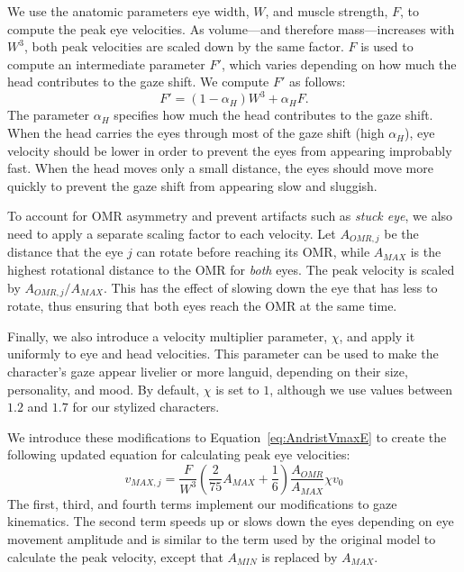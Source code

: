 We use the anatomic parameters eye width, $W$, and muscle strength, $F$, to compute the peak eye velocities. As volume---and therefore mass---increases with $W^3$, both peak velocities are scaled down by the same factor. $F$ is used to compute an intermediate parameter $F'$, which varies depending on how much the head contributes to the gaze shift. We compute $F'$ as follows:
%
\begin{equation}
F' = ( 1 - \alpha_H ) W^3 + \alpha_H F.
\end{equation}
%
The parameter $\alpha_H$ specifies how much the head contributes to the gaze shift. When the head carries the eyes through most of the gaze shift (high $\alpha_H$), eye velocity should be lower in order to prevent the eyes from appearing improbably fast. When the head moves only a small distance, the eyes should move more quickly to prevent the gaze shift from appearing slow and sluggish.

To account for OMR asymmetry and prevent artifacts such as \textit{stuck eye}, we also need to apply a separate scaling factor to each velocity. Let $A_{OMR,j}$ be the distance that the eye $j$ can rotate before reaching its OMR, while $A_{MAX}$ is the highest rotational distance to the OMR for \emph{both} eyes. The peak velocity is scaled by $A_{OMR,j}/A_{MAX}$. This has the effect of slowing down the eye that has less to rotate, thus ensuring that both eyes reach the OMR at the same time.

Finally, we also introduce a velocity multiplier parameter, $\chi$, and apply it uniformly to eye and head velocities. This parameter can be used to make the character's gaze appear livelier or more languid, depending on their size, personality, and mood. By default, $\chi$ is set to $1$, although we use values between $1.2$ and $1.7$ for our stylized characters.

We introduce these modifications to Equation~\ref{eq:AndristVmaxE} to create the following updated equation for calculating peak eye velocities:
%
\begin{equation}
v_{MAX,j} = \frac{F}{W^3}( \frac{2}{75} A_{MAX} + \frac{1}{6} ) \frac{A_{OMR}}{A_{MAX}} \chi v_0%
\end{equation}
%
The first, third, and fourth terms implement our modifications to gaze kinematics. The second term speeds up or slows down the eyes depending on eye movement amplitude and is similar to the term used by the original model to calculate the peak velocity, except that $A_{MIN}$ is replaced by $A_{MAX}$.

